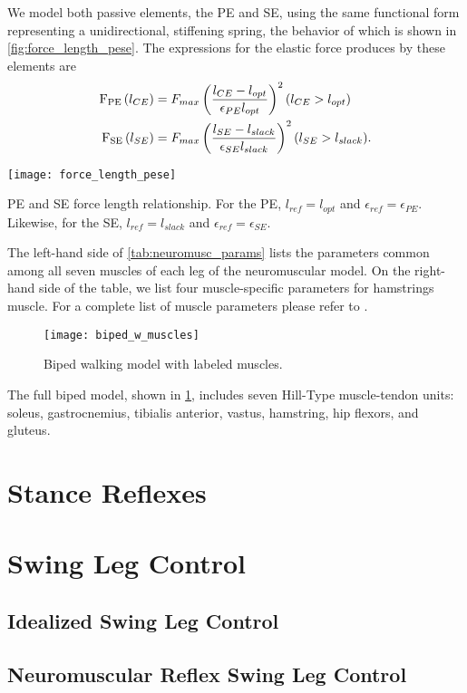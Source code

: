 We model both passive elements, the PE and SE, using the same functional form
representing a unidirectional, stiffening spring, the behavior of which is shown
in \cref{fig:force_length_pese}. The expressions for the elastic force produces
by these elements are
\begin{align}
    \mathrm{F_{PE}}\left( l_{CE} \right) &= F_{max} \left( \frac{l_{CE} - l_{opt}}{\epsilon_{PE}
        l_{opt}} \right)^2 (l_{CE} > l_{opt})\\
    \mathrm{F_{SE}}\left( l_{SE} \right) &= F_{max} \left( \frac{l_{SE} - l_{slack}}{\epsilon_{SE}
        l_{slack}} \right)^2 (l_{SE} > l_{slack}).
\end{align}
\begin{marginfigure}
    \centering
    \texttt{[image: force\_length\_pese]}
    \caption{PE and SE force length relationship. For the PE, $l_{ref} = l_{opt}$
    and $\epsilon_{ref} = \epsilon_{PE}$. Likewise, for the SE, $l_{ref} =
    l_{slack}$ and $\epsilon_{ref} = \epsilon_{SE}$.} 
    \label{fig:force_length_pese}
\end{marginfigure}

The left-hand side of \cref{tab:neuromusc_params} lists the parameters common
among all seven muscles of each leg of the neuromuscular model. On the
right-hand side of the table, we list four muscle-specific parameters for
hamstrings muscle. For a complete list of muscle parameters please refer
to \citet{song2015neural}. 

\begin{figure}[b]
    \centering
    \texttt{[image: biped\_w\_muscles]}
    \caption{Biped walking model with labeled muscles.} 
    \label{fig:biped_w_muscles}
\end{figure} 
The full biped model, shown in \cref{fig:biped_w_muscles}, includes
seven Hill-Type muscle-tendon units: soleus, gastrocnemius, tibialis anterior,
vastus, hamstring, hip flexors, and gluteus.

\section{Stance Reflexes}\label{sec:neuro_stance_reflexes}
\section{Swing Leg Control}\label{sec:neuro_swing_reflexes}
\subsection{Idealized Swing Leg Control}
\subsection{Neuromuscular Reflex Swing Leg Control}
